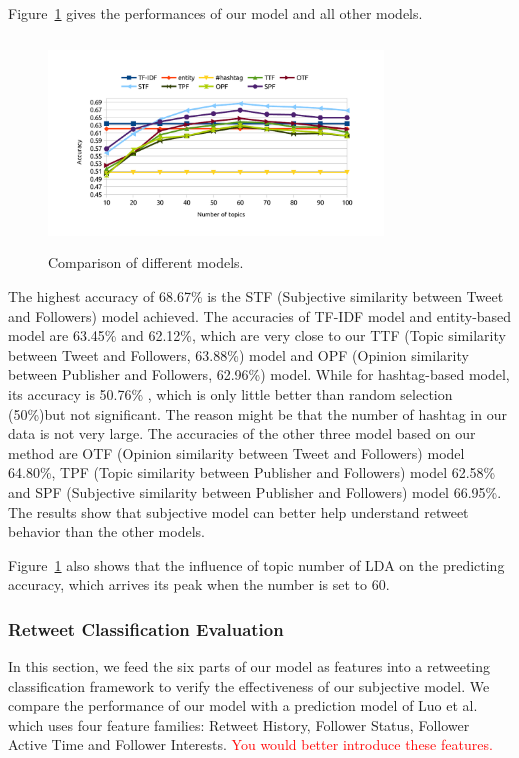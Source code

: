 \documentclass{acm_proc_article-sp}
\newcommand{\mo}[1]{\textcolor{red}{#1}}
\begin{document}
Figure~\ref{fig:graph7} gives the performances of our model and all other models.
\begin{figure}[htb]
\centering
\includegraphics[width=3.5in,height=2.2in]{comparison.pdf}
\caption{Comparison of different models.}
\label{fig:graph7}
\end{figure}

The highest accuracy of 68.67\% is the STF (Subjective similarity between Tweet and Followers) model achieved.
The accuracies of TF-IDF model and entity-based model are 63.45\% and 62.12\%, which are very close to our TTF (Topic similarity between Tweet and Followers, 63.88\%) model and OPF (Opinion similarity between Publisher and Followers, 62.96\%) model.
While for hashtag-based model, its accuracy is  50.76\% , which is only little better than random selection (50\%)but not significant. The reason might be that the number of hashtag in our data is not very large. 
The accuracies of the other three model based on our method are OTF (Opinion similarity between Tweet and Followers) model 64.80\%, TPF (Topic similarity between Publisher and Followers) model 62.58\% and SPF (Subjective similarity between Publisher and Followers) model 66.95\%.
The results show that subjective model can better help understand retweet behavior than the other models.

Figure~\ref{fig:graph7} also shows that the influence of topic number of LDA on the predicting accuracy, which arrives its peak when the number is set to 60.

\subsubsection{Retweet Classification Evaluation}
\label{classifiction}
In this section, we feed the six parts of our model as features into a retweeting classification framework to verify the effectiveness of our subjective model. 
We compare the performance of our model with a prediction model of Luo et al. \cite{Luo:2013RMF} which uses four feature families: Retweet History, Follower Status, Follower Active Time and Follower Interests. \mo{You would better introduce these features.}
\end{document}
